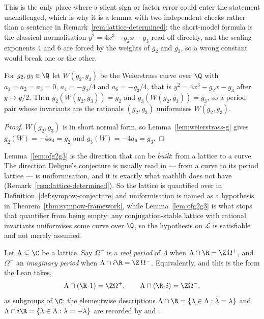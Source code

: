 This is the only place where a silent sign or factor error could enter the statement unchallenged,
which is why it is a lemma with two independent checks rather than a sentence in
Remark~\ref{rem:lattice-determined}: the short-model formula is the classical normalisation
$y^{2}=4x^{3}-g_{2}x-g_{3}$ read off directly, and the scaling exponents $4$ and $6$ are forced
by the weights of $g_{2}$ and $g_{3}$, so a wrong constant would break one or the other.

\begin{lemma}
  \label{lem:ofg2g3}
  For $g_{2},g_{3} \in \Q$ let $W(g_{2},g_{3})$ be the Weierstrass curve over $\Q$ with
  $a_{1}=a_{2}=a_{3}=0$, $a_{4}=-g_{2}/4$ and $a_{6}=-g_{3}/4$, that is $y^{2}=4x^{3}-g_{2}x-g_{3}$
  after $y \mapsto y/2$. Then $g_{2}(W(g_{2},g_{3}))=g_{2}$ and $g_{3}(W(g_{2},g_{3}))=g_{3}$, so
  a period pair whose invariants are the rationals $(g_{2},g_{3})$ uniformises $W(g_{2},g_{3})$.
\end{lemma}
\begin{proof}
  $W(g_{2},g_{3})$ is in short normal form, so Lemma~\ref{lem:weierstrass-g} gives
  $g_{2}(W) = -4a_{4} = g_{2}$ and $g_{3}(W) = -4a_{6} = g_{3}$.
\end{proof}

Lemma~\ref{lem:ofg2g3} is the direction that can be \emph{built}: from a lattice to a curve. The
direction Deligne's conjecture is usually read in --- from a curve to its period lattice --- is
uniformisation, and it is exactly what mathlib does not have
(Remark~\ref{rem:lattice-determined}). So the lattice is quantified over in
Definition~\ref{def:sympow-conjecture} and uniformisation is named as a hypothesis in
Theorem~\ref{thm:sympow-framework}, while Lemma~\ref{lem:ofg2g3} is what stops that quantifier
from being empty: any conjugation-stable lattice with rational invariants uniformises some curve
over $\Q$, so the hypothesis on $\mathcal{L}$ is satisfiable and not merely assumed.

\begin{definition}
  \label{def:sympow-periods}
  Let $\Lambda \subseteq \C$ be a lattice. Say $\Omega^{+}$ is a \emph{real period} of $\Lambda$
  when $\Lambda \cap \R = \Z\,\Omega^{+}$, and $\Omega^{-}$ an \emph{imaginary period} when
  $\Lambda \cap i\R = \Z\,\Omega^{-}$. Equivalently, and this is the form the Lean takes,
  \[
    \Lambda \sqcap (\R\!\cdot\!1) = \Z\Omega^{+},
    \qquad
    \Lambda \sqcap (\R\!\cdot\!i) = \Z\Omega^{-},
  \]
  as subgroups of $\C$; the elementwise descriptions
  $\Lambda \cap \R = \{\lambda \in \Lambda : \bar{\lambda}=\lambda\}$ and
  $\Lambda \cap i\R = \{\lambda \in \Lambda : \bar{\lambda}=-\lambda\}$ are recorded by
   and .
\end{definition}

